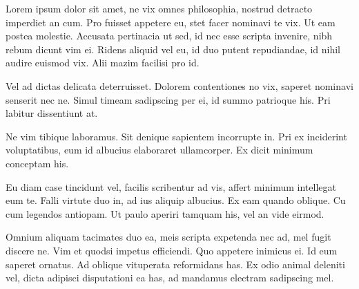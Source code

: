 Lorem ipsum dolor sit amet, ne vix omnes philosophia, nostrud detracto imperdiet an cum. Pro fuisset appetere eu, stet facer nominavi te vix. Ut eam postea molestie. Accusata pertinacia ut sed, id nec esse scripta invenire, nibh rebum dicunt vim ei. Ridens aliquid vel eu, id duo putent repudiandae, id nihil audire euismod vix. Alii mazim facilisi pro id.

Vel ad dictas delicata deterruisset. Dolorem contentiones no vix, saperet nominavi senserit nec ne. Simul timeam sadipscing per ei, id summo patrioque his. Pri labitur dissentiunt at.

Ne vim tibique laboramus. Sit denique sapientem incorrupte in. Pri ex inciderint voluptatibus, eum id albucius elaboraret ullamcorper. Ex dicit minimum conceptam his.

Eu diam case tincidunt vel, facilis scribentur ad vis, affert minimum intellegat eum te. Falli virtute duo in, ad ius aliquip albucius. Ex eam quando oblique. Cu cum legendos antiopam. Ut paulo aperiri tamquam his, vel an vide eirmod.

Omnium aliquam tacimates duo ea, meis scripta expetenda nec ad, mel fugit discere ne. Vim et quodsi impetus efficiendi. Quo appetere inimicus ei. Id eum saperet ornatus. Ad oblique vituperata reformidans has. Ex odio animal deleniti vel, dicta adipisci disputationi ea has, ad mandamus electram sadipscing mel.